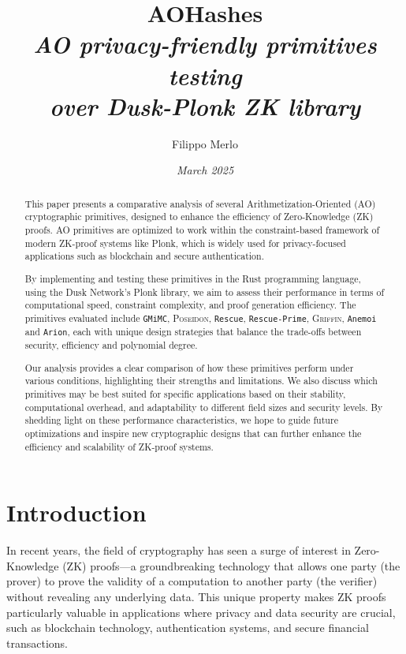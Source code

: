 \documentclass[12pt, a4paper]{report}
\title{{\textbf{AOHashes}}\\[20pt]\textsl{AO privacy-friendly primitives testing\\over Dusk-\textsf{Plonk} ZK library}}
\author{\Large{Filippo Merlo}}
\date{\textit{March 2025}}
\begin{document}
\maketitle
\newpage
{}
\tableofcontents
\pagebreak

\begin{abstract}
  This paper presents a comparative analysis of several Arithmetization-Oriented (AO) cryptographic primitives, designed to enhance the efficiency of Zero-Knowledge (ZK) proofs. AO primitives are optimized to work within the constraint-based framework of modern ZK-proof systems like \textsf{Plonk}, which is widely used for privacy-focused applications such as blockchain and secure authentication.

By implementing and testing these primitives in the Rust programming language, using the Dusk Network’s \textsf{Plonk} library, we aim to assess their performance in terms of computational speed, constraint complexity, and proof generation efficiency. The primitives evaluated include \texttt{GMiMC}, \textsc{Poseidon}, \texttt{Rescue}, \texttt{Rescue-Prime}, \textsc{Griffin}, \texttt{Anemoi} and \texttt{Arion}, each with unique design strategies that balance the trade-offs between security, efficiency and polynomial degree.

Our analysis provides a clear comparison of how these primitives perform under various conditions, highlighting their strengths and limitations. We also discuss which primitives may be best suited for specific applications based on their stability, computational overhead, and adaptability to different field sizes and security levels. By shedding light on these performance characteristics, we hope to guide future optimizations and inspire new cryptographic designs that can further enhance the efficiency and scalability of ZK-proof systems.

\end{abstract}

\chapter{Introduction}\label{chap:intro}

In recent years, the field of cryptography has seen a surge of interest in Zero-Knowledge (ZK) proofs—a groundbreaking technology that allows one party (the prover) to prove the validity of a computation to another party (the verifier) without revealing any underlying data. This unique property makes ZK proofs particularly valuable in applications where privacy and data security are crucial, such as blockchain technology, authentication systems, and secure financial transactions.
\end{document}
